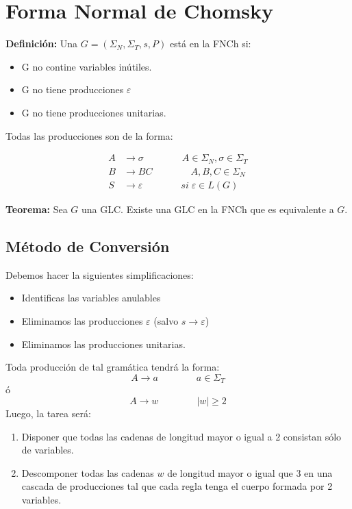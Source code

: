 \chapter{Forma Normal de Chomsky}

\textbf{Definición: }Una $G=(\Sigma_N,\Sigma_T,s,P)$ está en la FNCh si:

\begin{itemize}
\item G no contine variables inútiles.
\item G no tiene producciones $\varepsilon$
\item G no tiene producciones unitarias.
\end{itemize}

Todas las producciones son de la forma:

\begin{align*}
A &\rightarrow \sigma \qquad\qquad A\in \Sigma_N	, \sigma \in \Sigma_T\\
B &\rightarrow BC	\qquad\qquad A,B,C \in \Sigma_N	\\
S &\rightarrow \varepsilon \qquad\qquad si\; \varepsilon\in L(G)
\end{align*}

\textbf{Teorema: }Sea $G$ una GLC. Existe una GLC en la FNCh que es equivalente a $G$.

\section{Método de Conversión}
Debemos hacer la siguientes simplificaciones:
\begin{itemize}
\item Identificas las variables anulables
\item Eliminamos las producciones $\varepsilon$ (salvo $s\rightarrow\varepsilon$)
\item Eliminamos las producciones unitarias.
\end{itemize}

Toda producción de tal gramática tendrá la forma:
$$A\rightarrow a \qquad\qquad a\in \Sigma_T$$
ó
$$A\rightarrow w \qquad\qquad |w|\geq 2$$
Luego, la tarea será:
\begin{enumerate}
\item Disponer que todas las cadenas de longitud mayor o igual a 2 consistan sólo de variables.
\item Descomponer todas las cadenas $w$ de longitud mayor o igual que 3 en una cascada de producciones tal que cada regla tenga el cuerpo formada por 2 variables.
\end{enumerate}

